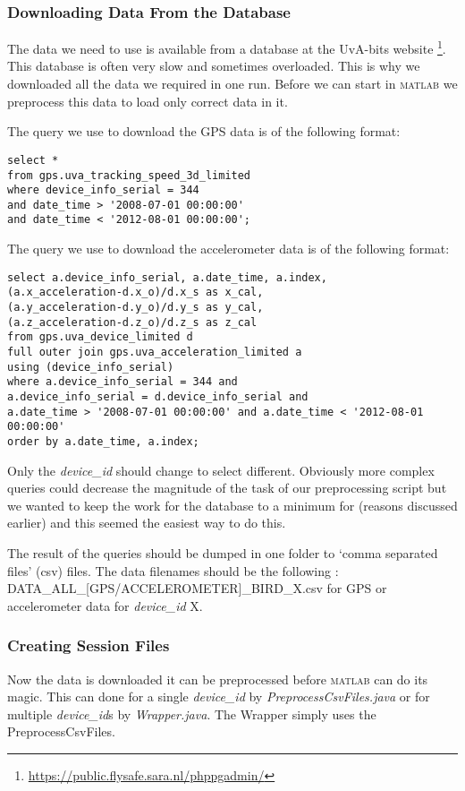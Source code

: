\subsubsection{Downloading Data From the Database}
The data we need to use is available from a database at the UvA-bits website
\footnote{\url{https://public.flysafe.sara.nl/phppgadmin/} }. This database is often very slow 
and sometimes overloaded. This is why we downloaded all the data we required in one run. 
Before we can start in \textsc{matlab} we preprocess this data to load only correct data
in it.

The query we use to download the GPS data is of the following format: 

%
\begin{verbatim}
select *
from gps.uva_tracking_speed_3d_limited
where device_info_serial = 344 
and date_time > '2008-07-01 00:00:00' 
and date_time < '2012-08-01 00:00:00';

\end{verbatim}

The query we use to download the accelerometer data is of the following format:
\begin{verbatim}
select a.device_info_serial, a.date_time, a.index,
(a.x_acceleration-d.x_o)/d.x_s as x_cal,
(a.y_acceleration-d.y_o)/d.y_s as y_cal,
(a.z_acceleration-d.z_o)/d.z_s as z_cal
from gps.uva_device_limited d
full outer join gps.uva_acceleration_limited a
using (device_info_serial)
where a.device_info_serial = 344 and
a.device_info_serial = d.device_info_serial and
a.date_time > '2008-07-01 00:00:00' and a.date_time < '2012-08-01 00:00:00'
order by a.date_time, a.index;
\end{verbatim}

Only the \textit{device\_id} should change to select different. Obviously more complex queries could 
decrease the magnitude of the task of our preprocessing script but we wanted to keep the
work for the database to a minimum for (reasons discussed earlier) and this seemed the
easiest way to do this. 

The result of the queries should be dumped in one folder to `comma separated files' (csv) files.
The data filenames should be the following : DATA\_ALL\_[GPS/ACCELEROMETER]\_BIRD\_X.csv for 
GPS or accelerometer data for \textit{device\_id} X. 

\subsubsection{Creating Session Files}
Now the data is downloaded it can be preprocessed before \textsc{matlab} can do its magic. 
This can done for a single \textit{device\_id} by \textit{PreprocessCsvFiles.java} or 
for multiple \textit{device\_id}s by \textit{Wrapper.java}. The Wrapper simply uses the PreprocessCsvFiles. 

